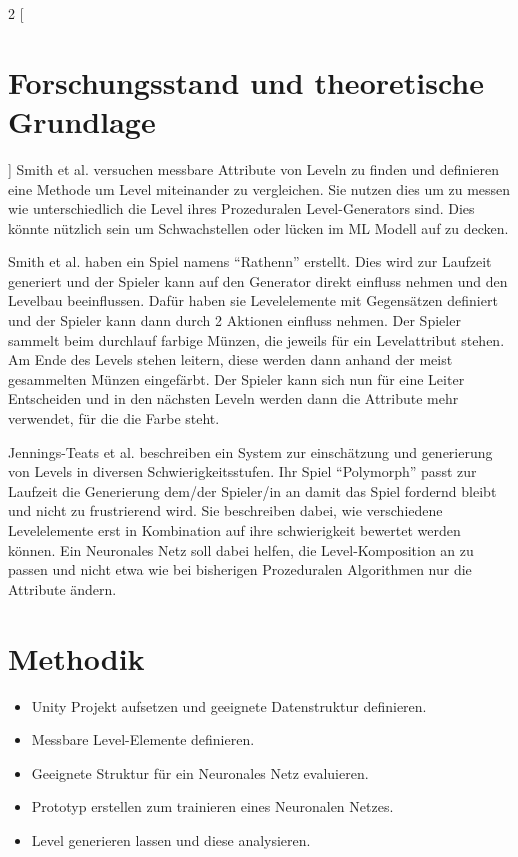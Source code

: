 \documentclass[10pt,a4paper]{article}
\begin{document}
\begin{multicols}{2}
[
\section{Forschungsstand und theoretische Grundlage}
]
Smith\cite{Smith2010} et al. versuchen messbare Attribute von Leveln zu finden und definieren eine Methode um Level miteinander zu vergleichen. Sie nutzen dies um zu messen wie unterschiedlich die Level ihres Prozeduralen Level-Generators sind. Dies könnte nützlich sein um Schwachstellen oder lücken im ML Modell auf zu decken.\linebreak

Smith\cite{Smith2011} et al. haben ein Spiel namens “Rathenn” erstellt. Dies wird zur Laufzeit generiert und der Spieler kann auf den Generator direkt einfluss nehmen und den Levelbau beeinflussen. Dafür haben sie Levelelemente mit Gegensätzen definiert und der Spieler kann dann durch 2 Aktionen einfluss nehmen. Der Spieler sammelt beim durchlauf farbige Münzen, die jeweils für ein Levelattribut stehen. Am Ende des Levels stehen leitern, diese werden dann anhand der meist gesammelten Münzen eingefärbt. Der Spieler kann sich nun für eine Leiter Entscheiden und in den nächsten Leveln werden dann die Attribute mehr verwendet, für die die Farbe steht.\linebreak

Jennings-Teats\cite{Jennings-Teats2010} et al. beschreiben ein System zur einschätzung und generierung von Levels in diversen Schwierigkeitsstufen. Ihr Spiel “Polymorph” passt zur Laufzeit die Generierung dem/der Spieler/in an damit das Spiel fordernd bleibt und nicht zu frustrierend wird. Sie beschreiben dabei, wie verschiedene Levelelemente erst in Kombination auf ihre schwierigkeit bewertet werden können. Ein Neuronales Netz soll dabei helfen, die Level-Komposition an zu passen und nicht etwa wie bei bisherigen Prozeduralen Algorithmen nur die Attribute ändern.
\end{multicols}

\section{Methodik}
\begin{itemize}
\item Unity Projekt aufsetzen und geeignete Datenstruktur definieren.
\item Messbare Level-Elemente definieren.
\item Geeignete Struktur für ein Neuronales Netz evaluieren.
\item Prototyp erstellen zum trainieren eines Neuronalen Netzes.
\item Level generieren lassen und diese analysieren.
\end{itemize}
\end{document}
